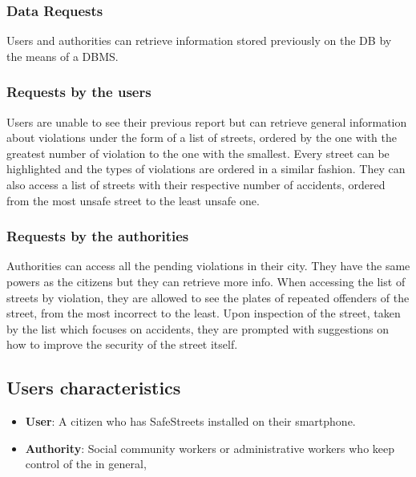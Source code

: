 \subsubsection{Data Requests}

Users and authorities can retrieve information stored previously on the DB by the means of a DBMS.

\subsubsection*{Requests by the users}

Users are unable to see their previous report but can retrieve general information about violations under the form of a list of streets, ordered by the one with the greatest number of violation to the one with the smallest. Every street can be highlighted and the types of violations are ordered in a similar fashion. They can also access a list of streets with their respective number of accidents, ordered from the most unsafe street to the least unsafe one.

\subsubsection*{Requests by the authorities}

Authorities can access all the pending violations in their city. They have the same powers as the citizens but they can retrieve more info. When accessing the list of streets by violation, they are allowed to see the plates of repeated offenders of the street, from the most incorrect to the least. Upon inspection of the street, taken by the list which focuses on accidents, they are prompted with suggestions on how to improve the security of the street itself.


\subsection{Users characteristics}

\begin{itemize}

\item \textbf{User}: A citizen who has SafeStreets installed on their smartphone.

\item \textbf{Authority}: Social community workers or administrative workers who keep control of the in general,

\end{itemize}

